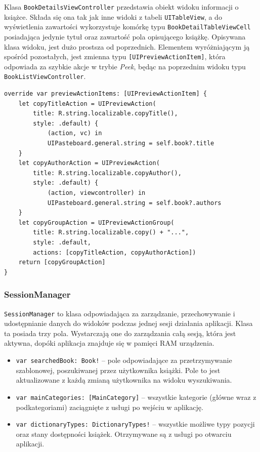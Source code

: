 \documentclass[twoside]{projektInzynierskiMS}
\begin{document}
Klasa \verb`BookDetailsViewController` przedstawia obiekt widoku informacji o książce. Składa się ona tak jak inne widoki z tabeli \verb`UITableView`, a do wyświetlenia zawartości wykorzystuje komórkę typu \verb`BookDetailTableViewCell` posiadająca jedynie tytuł oraz zawartość pola opisującego książkę. Opisywana klasa widoku, jest dużo prostsza od poprzednich. Elementem wyróżniającym ją spośród pozostałych, jest zmienna typu \verb`[UIPreviewActionItem]`, która odpowiada za szybkie akcje w trybie \textit{Peek}, będąc na poprzednim widoku typu \verb`BookListViewController`.
\begin{verbatim}
override var previewActionItems: [UIPreviewActionItem] {
    let copyTitleAction = UIPreviewAction(
        title: R.string.localizable.copyTitle(),
        style: .default) {
            (action, vc) in
            UIPasteboard.general.string = self.book?.title
    }
    let copyAuthorAction = UIPreviewAction(
        title: R.string.localizable.copyAuthor(),
        style: .default) {
            (action, viewcontroller) in
            UIPasteboard.general.string = self.book?.authors
    }
    let copyGroupAction = UIPreviewActionGroup(
        title: R.string.localizable.copy() + "...",
        style: .default,
        actions: [copyTitleAction, copyAuthorAction])
    return [copyGroupAction]
}
\end{verbatim} 


\subsubsection{SessionManager}

\verb`SessionManager` to klasa odpowiadająca za zarządzanie, przechowywanie i udostępnianie danych do widoków podczas jednej sesji działania aplikacji. Klasa ta posiada trzy pola. Wystarczają one do zarządzania całą sesją, która jest aktywna, dopóki aplikacja znajduje się w pamięci RAM urządzenia.
\begin{itemize}
\item \verb`var searchedBook: Book!` -- pole odpowiadające za przetrzymywanie szablonowej, poszukiwanej przez użytkownika książki. Pole to jest aktualizowane z każdą zmianą użytkownika na widoku wyszukiwania.
\item \verb`var mainCategories: [MainCategory]` -- wszystkie kategorie (główne wraz z podkategoriami) zaciągnięte z usługi po wejściu w aplikację.
\item \verb`var dictionaryTypes: DictionaryTypes!` -- wszystkie możliwe typy pozycji oraz stany dostępności książek. Otrzymywane są z usługi po otwarciu aplikacji.
\end{itemize}
\end{document}
